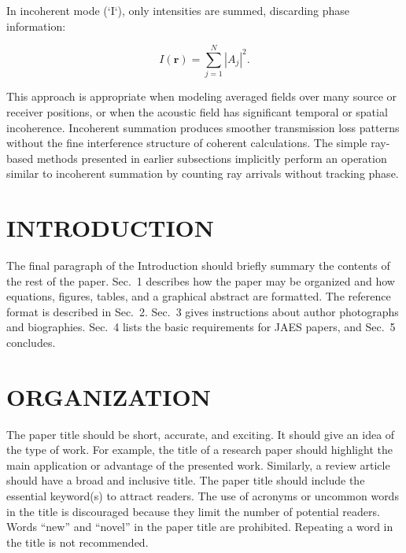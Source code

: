 \documentclass[fleqn]{jaes}
\begin{document}
In incoherent mode (`I`), only intensities are summed, discarding phase information:

\begin{equation}
I(\mathbf{r}) = \sum_{j=1}^{N} |A_j|^2.
\end{equation}

This approach is appropriate when modeling averaged fields over many source or receiver positions, or when the acoustic field has significant temporal or spatial incoherence. Incoherent summation produces smoother transmission loss patterns without the fine interference structure of coherent calculations. The simple ray-based methods presented in earlier subsections implicitly perform an operation similar to incoherent summation by counting ray arrivals without tracking phase.














\newpage
\clearpage
\section{INTRODUCTION}

The final paragraph of the Introduction should briefly summary the contents of the rest of the paper. Sec.~1 describes how the paper may be organized and how equations, figures, tables, and a graphical abstract are formatted. The reference format is described in Sec.~2. Sec.~3 gives instructions about author photographs and biographies. Sec.~4 lists the basic requirements for JAES papers, and Sec.~5 concludes. 
\section{ORGANIZATION}

The paper title should be short, accurate, and exciting. It should give an idea of the type of work. For example, the title of a research paper should highlight the main application or advantage of the presented work. Similarly, a review article should have a broad and inclusive title. The paper title should include the essential keyword(s) to attract readers. The use of acronyms or uncommon words in the title is discouraged because they limit the number of potential readers. Words “new” and “novel” in the paper title are prohibited. Repeating a word in the title is not recommended.
\end{document}
